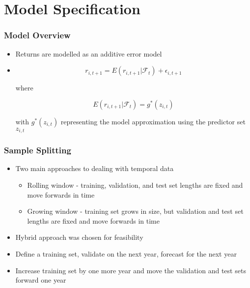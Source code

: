 \documentclass[]{beamer}
\begin{document}
\section{Model Specification}

\begin{frame}
\frametitle{Model Overview}
\begin{itemize}
	\item Returns are modelled as an additive error model
	\item
		\begin{equation}
		r_{i, t+1} = E(r_{i, t+1} | \mathcal{F}_t) + \epsilon_{i, t+1}
		\end{equation}
		
		where 
		
		\begin{equation}
		E(r_{i, t+1} | \mathcal{F}_t) = g^*(z_{i,t})
		\end{equation}
		
		with $g^*(z_{i,t})$ representing the model approximation using the predictor set $z_{i,t}$
\end{itemize}
\end{frame}


\begin{frame}
\frametitle{Sample Splitting}
\begin{itemize}
	\item Two main approaches to dealing with temporal data
	\begin{itemize}
		\item Rolling window - training, validation, and test set lengths are fixed and move forwards in time
		\item Growing window - training set grows in size, but validation and test set lengths are fixed and move forwards in time
	\end{itemize}
	\item Hybrid approach was chosen for feasibility
	\item Define a training set, validate on the next year, forecast for the next year
	\item Increase training set by one more year and move the validation and test sets forward one year
\end{itemize}
\end{frame}
\end{document}
